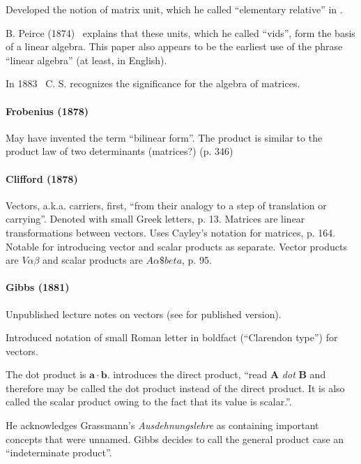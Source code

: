 Developed the notion of matrix unit, which he called ``elementary relative'' in \cite[p.359]{Peirce1873}.

B. Peirce (1874)~\cite{Peirce1874} explains that these units, which he called ``vids'', form the basis of a linear algebra.
This paper also appears to be the earliest use of the phrase ``linear algebra'' (at least, in English).

In 1883~\cite{Peirce1883} C. S. recognizes the significance for the algebra of matrices.

\paragraph{Frobenius (1878)~\cite{Frobenius1878}}

May have invented the term ``bilinear form''.
The product is similar to the product law of two determinants (matrices?) (p. 346)


\paragraph{Clifford (1878)~\cite{Clifford1878}}

Vectors, a.k.a. carriers, first, ``from their analogy to a step of translation or carrying''.
Denoted with small Greek letters, p. 13.
Matrices are linear transformations between vectors. Uses Cayley's notation for matrices, p. 164.
Notable for introducing vector and scalar products as separate.
Vector products are $V\alpha\beta$ and scalar products are $A\alpha\$beta$, p. 95.



\paragraph{Gibbs (1881)~\cite{Gibbs1881}}

Unpublished lecture notes on vectors (see \cite{Wilson1901} for published version).

Introduced notation of small Roman letter in boldfact (``Clarendon type'') for vectors.

The dot product is $\mathbf a \cdot \mathbf b$.
\cite[p. 55]{Wilson1901} introduces the direct product, ``read \textbf{A} \textit{dot} \textbf{B} and therefore may be called the dot product instead of the direct product. It is also called the scalar product owing to the fact that its value is scalar.''.

He acknowledges Grassmann's \textit{Ausdehnungslehre} as containing important concepts that were unnamed. Gibbs decides to call the general product case an ``indeterminate product''.

